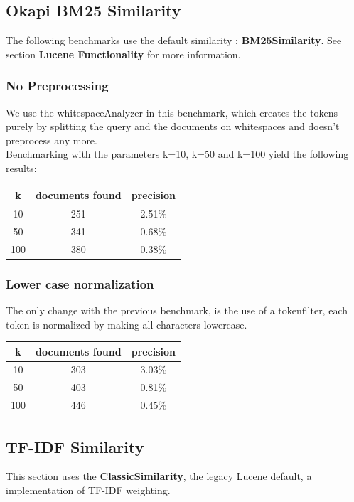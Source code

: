\documentclass{article}
\begin{document}
\subsection{Okapi BM25 Similarity}
The following benchmarks use the default similarity : \textbf{BM25Similarity}. See section \textbf{Lucene Functionality} for more information.
\subsubsection{No Preprocessing}
We use the whitespaceAnalyzer in this benchmark, which creates the tokens purely by splitting the query and the documents on whitespaces and doesn't preprocess any more. \\
Benchmarking with the parameters k=10, k=50 and k=100 yield the following results:\\

\begin{center}
\begin{tabular}{|c|c|c|} \hline
\textbf{k} & \textbf{documents found} & \textbf{precision}\\ \hline
10 & 251 & 2.51\%\\
50 & 341 & 0.68\%\\
100 & 380 & 0.38\%\\ \hline
\end{tabular}
\end{center}
\subsubsection{Lower case normalization}
The only change with the previous benchmark, is the use of a tokenfilter, each token is normalized by making all characters lowercase.

\begin{center}
\begin{tabular}{|c|c|c|} \hline
\textbf{k} & \textbf{documents found} & \textbf{precision}\\ \hline
10 & 303 & 3.03\%\\
50 & 403 & 0.81\%\\
100 & 446 & 0.45\%\\ \hline
\end{tabular}
\end{center}

\subsection{TF-IDF Similarity}
This section uses the \textbf{ClassicSimilarity}, the legacy Lucene default, a implementation of TF-IDF weighting.
\end{document}
